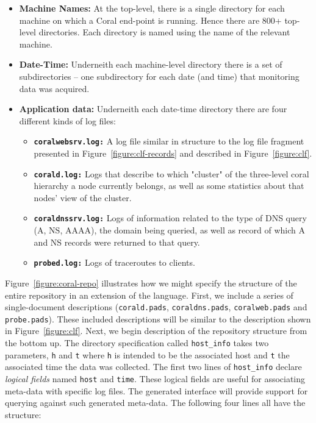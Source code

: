 \begin{itemize}
\item {\bf Machine Names:}  At the top-level, there is a single directory for
each machine on which a Coral end-point is running.  Hence there are 800+ 
top-level directories.  Each directory
is named using the name of the relevant machine.  
\item {\bf Date-Time:}  Underneith each machine-level directory there is
a set of subdirectories -- one subdirectory for each date (and time) that
monitoring data was acquired.  
\item {\bf Application data:}  Underneith each date-time directory there
are four different kinds of log files:
\begin{itemize}
\item {\bf\tt coralwebsrv.log:}  A log file similar in structure to the log
file fragment presented in Figure~\ref{figure:clf-records} and described in 
Figure~\ref{figure:clf}.
\item {\bf\tt corald.log:}  Logs that describe to which "cluster" of the 
three-level coral hierarchy a node currently belongs, as well as some 
statistics about that nodes' view of the cluster.
\item {\bf\tt coraldnssrv.log:}  Logs of information related to the type of 
DNS query (A, NS, AAAA), the domain being queried, as well as record of 
which A and NS records were returned to that query.
\item {\bf\tt probed.log:}  Logs of traceroutes to clients.
\end{itemize}
\end{itemize}

Figure~\ref{figure:coral-repo} illustrates how we might specify the structure
of the entire repository in an extension of the \pads{} language.  First,
we include a series of single-document descriptions ({\tt corald.pads},
{\tt coraldns.pads}, {\tt coralweb.pads} and {\tt probe.pads}).  These 
included descriptions will be similar to the description shown in
Figure~\ref{figure:clf}.  Next, we begin description of the repository
structure from the bottom up.  The directory specification
called {\tt  host\_info} takes two parameters, {\tt h} and {\tt t}
where {\tt h} is intended to be the associated host and {\tt t} the
associated time the data was collected.  The first two lines of 
{\tt  host\_info} declare {\em logical fields} named {\tt host} and
{\tt time}.  These logical fields are useful for associating meta-data with
specific log files.  The generated interface will provide support for querying
against such generated meta-data.  The following four lines all have the structure:

